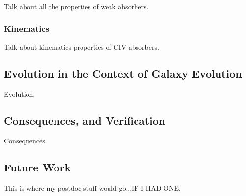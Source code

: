 Talk about all the properties of weak absorbers.

\subsubsection{Kinematics}
\label{ch8:CIVkinematics}

Talk about kinematics properties of CIV absorbers.

\subsection{Evolution in the Context of Galaxy Evolution}
\label{ch8:evolution}

Evolution.

\subsection{Consequences, and Verification}
\label{ch8:consequences}

Consequences.

\subsection{Future Work}
\label{ch8:futures}

This is where my postdoc stuff would go...IF I HAD ONE.
